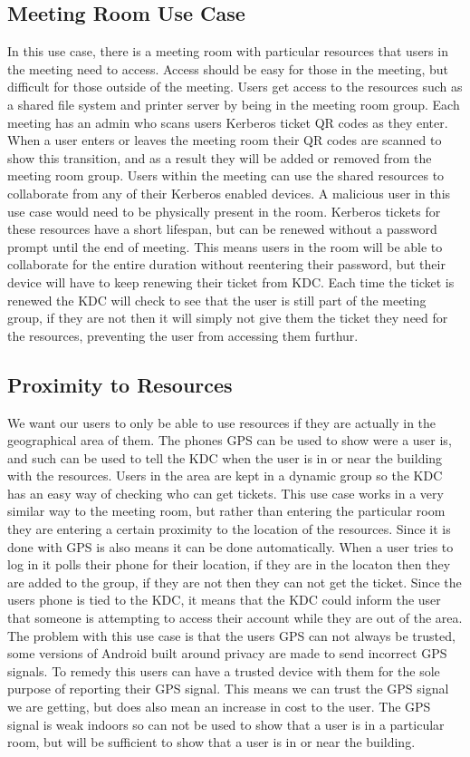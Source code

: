\documentclass[]{report}   %
\begin{document}
\subsection{Meeting Room Use Case}
In this use case, there is a meeting room with particular resources that users in the meeting need to access. Access should be easy for those in the meeting, but difficult for those outside of the meeting. Users get access to the resources such as a shared file system and printer server by being in the meeting room group. Each meeting has an admin who scans users Kerberos ticket QR codes as they enter. When a user enters or leaves the meeting room their QR codes are scanned to show this transition, and as a result they will be added or removed from the meeting room group. Users within the meeting can use the shared resources to collaborate from any of their Kerberos enabled devices. A malicious user in this use case would need to be physically present in the room. Kerberos tickets for these resources have a short lifespan, but can be renewed without a password prompt until the end of meeting. This means users in the room will be able to collaborate for the entire duration without reentering their password, but their device will have to keep renewing their ticket from KDC. Each time the ticket is renewed the KDC will check to see that the user is still part of the meeting group, if they are not then it will simply not give them the ticket they need for the resources, preventing the user from accessing them furthur.


\subsection{Proximity to Resources}
We want our users to only be able to use resources if they are actually in the geographical area of them. The phones GPS can be used to show were a user is, and such can be used to tell the KDC when the user is in or near the building with the resources. Users in the area are kept in a dynamic group so the KDC has an easy way of checking who can get tickets. This use case works in a very similar way to the meeting room, but rather than entering the particular room they are entering a certain proximity to the location of the resources. Since it is done with GPS is also means it can be done automatically. When a user tries to log in it polls their phone for their location, if they are in the locaton then they are added to the group, if they are not then they can not get the ticket. Since the users phone is tied to the KDC, it means that the KDC could inform the user that someone is attempting to access their account while they are out of the area. The problem with this use case is that the users GPS can not always be trusted, some versions of Android built around privacy are made to send incorrect GPS signals. To remedy this users can have a trusted device with them for the sole purpose of reporting their GPS signal. This means we can trust the GPS signal we are getting, but does also mean an increase in cost to the user. The GPS signal is weak indoors so can not be used to show that a user is in a particular room, but will be sufficient to show that a user is in or near the building.
\end{document}
